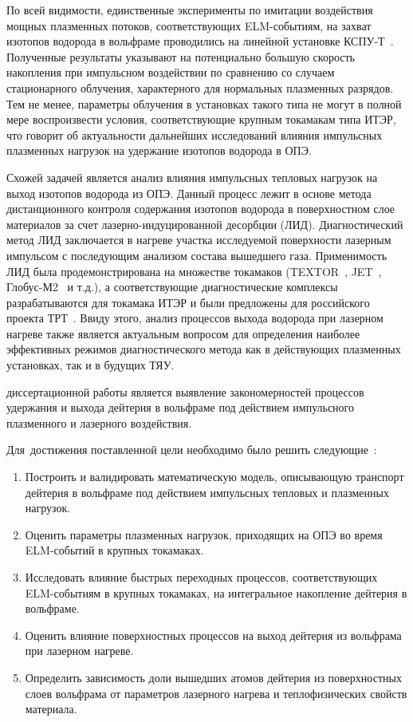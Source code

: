 По всей видимости, единственные эксперименты по имитации воздействия мощных плазменных потоков, соответствующих ELM-событиям, на захват изотопов водорода в вольфраме проводились на линейной установке КСПУ-Т~\cite{Ogorodnikova}. Полученные результаты указывают на потенциально большую скорость накопления при импульсном воздействии по сравнению со случаем стационарного облучения, характерного для нормальных плазменных разрядов. Тем не менее, параметры облучения в установках такого типа не могут в полной мере воспроизвести условия, соответствующие крупным токамакам типа ИТЭР, что говорит об актуальности дальнейших исследований влияния импульсных плазменных нагрузок на удержание изотопов водорода в ОПЭ.

Схожей задачей является анализ влияния импульсных тепловых нагрузок на выход изотопов водорода из ОПЭ. Данный процесс лежит в основе метода дистанционного контроля содержания изотопов водорода в поверхностном слое материалов за счет лазерно-индуцированной десорбции (ЛИД). Диагностический метод ЛИД заключается в нагреве участка исследуемой поверхности лазерным импульсом с последующим анализом состава вышедшего газа. Применимость ЛИД была продемонстрирована на множестве токамаков (TEXTOR~\cite{Schweer2009}, JET~\cite{Zlobinski2024}, Глобус-М2~\cite{Medvedev2024} и т.д.), а соответствующие диагностические комплексы разрабатываются для токамака ИТЭР и были предложены для российского проекта ТРТ~\cite{Razdobarin2022}. Ввиду этого, анализ процессов выхода водорода при лазерном нагреве также является актуальным вопросом для определения наиболее эффективных режимов диагностического метода как в действующих плазменных установках, так и в будущих ТЯУ.

{\aim} диссертационной работы является выявление закономерностей процессов удержания и выхода дейтерия в вольфраме под действием импульсного плазменного и
лазерного воздействия.

Для~достижения поставленной цели необходимо было решить следующие~{\tasks}:
\begin{enumerate}[beginpenalty=10000] %
    \item Построить и валидировать математическую модель, описывающую транспорт дейтерия в вольфраме под действием импульсных тепловых и плазменных нагрузок.
    \item Оценить параметры плазменных нагрузок, приходящих на ОПЭ во время ELM-событий в крупных токамаках.
    \item Исследовать влияние быстрых переходных процессов, соответствующих ELM-событиям в крупных токамаках, на интегральное накопление дейтерия в вольфраме.
    \item Оценить влияние поверхностных процессов на выход дейтерия из вольфрама при лазерном нагреве.
    \item Определить зависимость доли вышедших атомов дейтерия из поверхностных слоев вольфрама от параметров лазерного нагрева и теплофизических свойств материала.
\end{enumerate}

